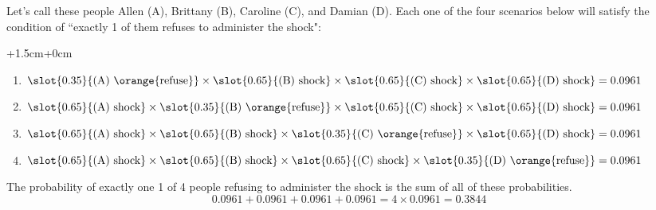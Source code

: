\documentclass[slidestop,compress,mathserif]{beamer}
\begin{document}

\begin{frame}

\pause
Let's call these people Allen (A), Brittany (B), Caroline (C), and Damian (D). Each one of the four scenarios below will satisfy the condition of ``exactly 1 of them refuses to administer the shock": \\
\vspace{0.25cm}
\pause
\begin{changemargin}{+1.5cm}{+0cm}
{\footnotesize
\begin{enumerate}
\item[Scenario 1:] $\slot{0.35}{\text{(A) \orange{refuse}}} \times \slot{0.65}{\text{(B) shock}} \times \slot{0.65}{\text{(C) shock}} \times \slot{0.65}{\text{(D) shock}} = 0.0961$
\pause
\item[Scenario 2:] $\slot{0.65}{\text{(A) shock}} \times \slot{0.35}{\text{(B) \orange{refuse}}}\times \slot{0.65}{\text{(C) shock}} \times \slot{0.65}{\text{(D) shock}} = 0.0961$
\pause
\item[Scenario 3:] $\slot{0.65}{\text{(A) shock}} \times \slot{0.65}{\text{(B) shock}} \times \slot{0.35}{\text{(C) \orange{refuse}}}\times \slot{0.65}{\text{(D) shock}} = 0.0961$
\pause
\item[Scenario 4:] $\slot{0.65}{\text{(A) shock}} \times \slot{0.65}{\text{(B) shock}} \times \slot{0.65}{\text{(C) shock}} \times \slot{0.35}{\text{(D) \orange{refuse}}} = 0.0961$
\end{enumerate}
}
\end{changemargin}
\pause
The probability of exactly one 1 of 4 people refusing to administer the shock is the sum of all of these probabilities.
\[ 0.0961+ 0.0961 + 0.0961 + 0.0961 = 4 \times 0.0961 = 0.3844 \]

\end{frame}

\end{document}
